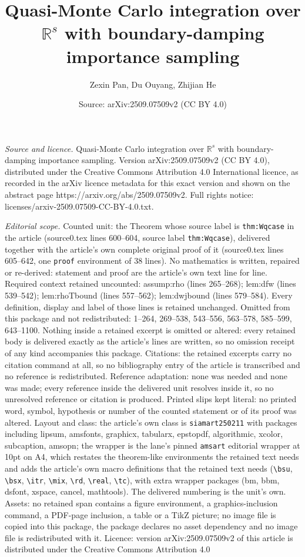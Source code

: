 \documentclass[10pt,a4paper]{amsart}
\title[Quasi-Monte Carlo integration over $\mathbb{R}^s$ with bound]{Quasi-Monte Carlo integration over $\mathbb{R}^s$ with boundary-damping importance sampling}
\author{Zexin Pan, Du Ouyang, Zhijian He}
\date{Source: arXiv:2509.07509v2 (CC BY 4.0)}
\begin{document}
\maketitle

\noindent\emph{Source and licence.} Quasi-Monte Carlo integration over $\mathbb{R}^s$ with boundary-damping importance sampling. Version arXiv:2509.07509v2 (CC BY 4.0), distributed under the Creative Commons Attribution 4.0 International licence, as recorded in the arXiv licence metadata for this exact version and shown on the abstract page https://arxiv.org/abs/2509.07509v2. Full rights notice: licenses/arxiv-2509.07509-CC-BY-4.0.txt.\par\smallskip

\noindent\textit{Editorial scope.} Counted unit: the Theorem whose source label is \texttt{thm:Wqcase} in the article (source0.tex lines 600--604, source label \texttt{thm:Wqcase}), delivered together with the article's own complete original proof of it (source0.tex lines 605--642, one \texttt{proof} environment of 38 lines). No mathematics is written, repaired or re-derived: statement and proof are the article's own text line for line. Required context retained uncounted: assump:rho (lines 265--268); lem:dfw (lines 539--542); lem:rhoTbound (lines 557--562); lem:dwjbound (lines 579--584). Every definition, display and label of those lines is retained unchanged. Omitted from this package and not redistributed: 1--264, 269--538, 543--556, 563--578, 585--599, 643--1100. Nothing inside a retained excerpt is omitted or altered: every retained body is delivered exactly as the article's lines are written, so no omission receipt of any kind accompanies this package. Citations: the retained excerpts carry no citation command at all, so no bibliography entry of the article is transcribed and no reference is redistributed. Reference adaptation: none was needed and none was made; every reference inside the delivered unit resolves inside it, so no unresolved reference or citation is produced. Printed slips kept literal: no printed word, symbol, hypothesis or number of the counted statement or of its proof was altered. Layout and class: the article's own class is \texttt{siamart250211} with packages including lipsum, amsfonts, graphicx, tabularx, epstopdf, algorithmic, xcolor, subcaption, amsopn; the wrapper is the lane's pinned \texttt{amsart} editorial wrapper at 10pt on A4, which restates the theorem-like environments the retained text needs and adds the article's own macro definitions that the retained text needs (\texttt{\textbackslash bsu}, \texttt{\textbackslash bsx}, \texttt{\textbackslash itr}, \texttt{\textbackslash mix}, \texttt{\textbackslash rd}, \texttt{\textbackslash real}, \texttt{\textbackslash tc}), with extra wrapper packages (bm, bbm, dsfont, xspace, cancel, mathtools). The delivered numbering is the unit's own. Assets: no retained span contains a figure environment, a graphics-inclusion command, a PDF-page inclusion, a table or a TikZ picture; no image file is copied into this package, the package declares no asset dependency and no image file is redistributed with it. Licence: version arXiv:2509.07509v2 of this article is distributed under the Creative Commons Attribution 4.0 
\end{document}
